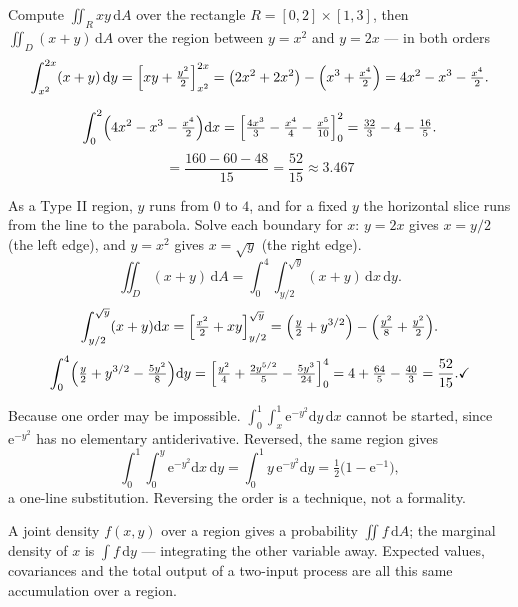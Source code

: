\begin{worked}{Compute $\iint_{R}xy\,\mathrm{d}A$ over the rectangle $R=[0,2]\times[1,3]$, then $\iint_{D}(x+y)\,\mathrm{d}A$ over the region between $y=x^{2}$ and $y=2x$ --- in both orders}
\[
  \int_{x^{2}}^{2x}(x+y)\,\mathrm{d}y
  =\Bigl[xy+\tfrac{y^{2}}{2}\Bigr]_{x^{2}}^{2x}
  =\bigl(2x^{2}+2x^{2}\bigr)-\Bigl(x^{3}+\tfrac{x^{4}}{2}\Bigr)
  =4x^{2}-x^{3}-\tfrac{x^{4}}{2} .
\]

\[
  \int_{0}^{2}\Bigl(4x^{2}-x^{3}-\tfrac{x^{4}}{2}\Bigr)\mathrm{d}x
  =\Bigl[\tfrac{4x^{3}}{3}-\tfrac{x^{4}}{4}-\tfrac{x^{5}}{10}\Bigr]_{0}^{2}
  =\tfrac{32}{3}-4-\tfrac{16}{5} .
\]
\[
  =\frac{160-60-48}{15}=\boxed{\frac{52}{15}\approx3.467}
\]

As a Type II region, $y$ runs from $0$ to $4$, and for a fixed $y$ the
horizontal slice runs from the line to the parabola. Solve each boundary for
$x$: $y=2x$ gives $x=y/2$ (the left edge), and $y=x^{2}$ gives $x=\sqrt y$
(the right edge).
\[
  \iint_{D}(x+y)\,\mathrm{d}A=\int_{0}^{4}\!\!\int_{y/2}^{\sqrt y}(x+y)\,\mathrm{d}x\,\mathrm{d}y .
\]
\[
  \int_{y/2}^{\sqrt y}(x+y)\mathrm{d}x
  =\Bigl[\tfrac{x^{2}}{2}+xy\Bigr]_{y/2}^{\sqrt y}
  =\Bigl(\tfrac y2+y^{3/2}\Bigr)-\Bigl(\tfrac{y^{2}}{8}+\tfrac{y^{2}}{2}\Bigr) .
\]
\[
  \int_{0}^{4}\Bigl(\tfrac y2+y^{3/2}-\tfrac{5y^{2}}{8}\Bigr)\mathrm{d}y
  =\Bigl[\tfrac{y^{2}}{4}+\tfrac{2y^{5/2}}{5}-\tfrac{5y^{3}}{24}\Bigr]_{0}^{4}
  =4+\tfrac{64}{5}-\tfrac{40}{3}=\frac{52}{15}. \checkmark
\]

Because one order may be impossible. $\int_{0}^{1}\int_{x}^{1}
\mathrm{e}^{-y^{2}}\mathrm{d}y\,\mathrm{d}x$ cannot be started, since
$\mathrm{e}^{-y^{2}}$ has no elementary antiderivative. Reversed, the same
region gives
\[
  \int_{0}^{1}\!\!\int_{0}^{y}\mathrm{e}^{-y^{2}}\mathrm{d}x\,\mathrm{d}y
  =\int_{0}^{1}y\,\mathrm{e}^{-y^{2}}\mathrm{d}y
  =\tfrac12\bigl(1-\mathrm{e}^{-1}\bigr),
\]
a one-line substitution. Reversing the order is a technique, not a
formality.

A joint density $f(x,y)$ over a region gives a probability
$\iint f\,\mathrm{d}A$; the marginal density of $x$ is $\int f\,\mathrm{d}y$
--- integrating the other variable away. Expected values, covariances and
the total output of a two-input process are all this same accumulation over
a region.
\end{worked}

